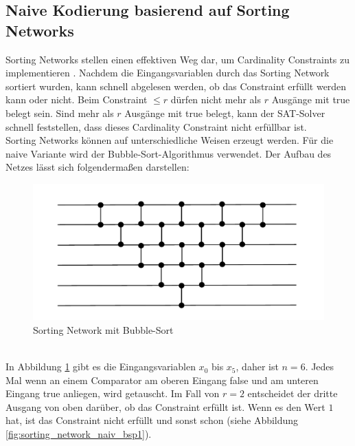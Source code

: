 \documentclass[a4,abstract=on]{scrartcl}
\begin{document}
	\subsection{Naive Kodierung basierend auf Sorting Networks}
Sorting Networks stellen einen effektiven Weg dar, um Cardinality Constraints zu implementieren \cite[vgl.][]{niklasse}. Nachdem die Eingangsvariablen durch das Sorting Network sortiert wurden, kann schnell abgelesen werden, ob das Constraint erfüllt werden kann oder nicht.
Beim Constraint $\leq r$ dürfen nicht mehr als $r$ Ausgänge mit true belegt sein. Sind mehr als $r$ Ausgänge mit true belegt, kann der SAT-Solver schnell feststellen, dass dieses Cardinality Constraint nicht erfüllbar ist.\\
Sorting Networks können auf unterschiedliche Weisen erzeugt werden.
Für die naive Variante wird der Bubble-Sort-Algorithmus \cite[vgl.][]{bubble} verwendet. Der Aufbau des Netzes lässt sich folgendermaßen darstellen:\\

\begin{figure}[H]
\centering
\includegraphics[width=\textwidth]{sorting_network_bubble.pdf}
\caption{Sorting Network mit Bubble-Sort}
\label{fig:sorting_network_naiv_bsp}
\end{figure}
\ \\
In Abbildung \ref{fig:sorting_network_naiv_bsp} gibt es die Eingangsvariablen $x_0$ bis $x_5$, daher ist $n=6$. Jedes Mal wenn an einem Comparator am oberen Eingang false und am unteren Eingang true anliegen, wird getauscht. Im Fall von $r=2$ entscheidet der dritte Ausgang von oben darüber, ob das Constraint erfüllt ist. Wenn es den Wert $1$ hat, ist das Constraint nicht erfüllt und sonst schon (siehe Abbildung \ref{fig:sorting_network_naiv_bsp1}).
\end{document}
